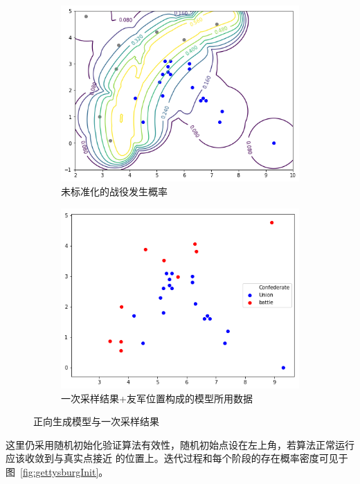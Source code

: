 \documentclass{article}
\begin{document}
\begin{figure}[ht]
  \begin{subfigure}[b]{0.49\linewidth}
    \includegraphics[width=\linewidth]{gettysburg-forward.png}
    \caption{未标准化的战役发生概率}
  \end{subfigure}
  \begin{subfigure}[b]{0.49\linewidth}
    \includegraphics[width=\linewidth]{gettysburg-sample.png}
    \caption{一次采样结果+友军位置构成的模型所用数据}
  \end{subfigure}
  \caption{正向生成模型与一次采样结果}
  \label{fig:gettysburgTwo}
\end{figure}


这里仍采用随机初始化验证算法有效性，随机初始点设在左上角，若算法正常运行应该收敛到与真实点接近
的位置上。迭代过程和每个阶段的存在概率密度可见于图~\ref{fig:gettysburgInit}。
\end{document}
